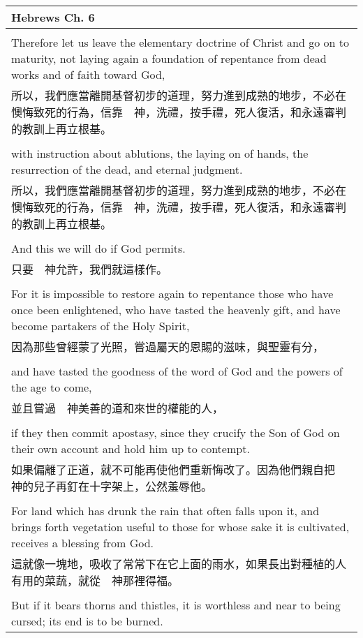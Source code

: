 \begin{tabularx}{\textwidth}{p{}}
\hline
Hebrews Ch. 6 \\
\hline \\
Therefore let us leave the elementary doctrine of Christ and go on to maturity, not laying again a foundation of repentance from dead works and of faith toward God, \\
所以，我們應當離開基督初步的道理，努力進到成熟的地步，不必在懊悔致死的行為，信靠　神，洗禮，按手禮，死人復活，和永遠審判的教訓上再立根基。 \\ \\
with instruction about ablutions, the laying on of hands, the resurrection of the dead, and eternal judgment. \\
所以，我們應當離開基督初步的道理，努力進到成熟的地步，不必在懊悔致死的行為，信靠　神，洗禮，按手禮，死人復活，和永遠審判的教訓上再立根基。 \\ \\
And this we will do if God permits. \\
只要　神允許，我們就這樣作。 \\ \\
For it is impossible to restore again to repentance those who have once been enlightened, who have tasted the heavenly gift, and have become partakers of the Holy Spirit, \\
因為那些曾經蒙了光照，嘗過屬天的恩賜的滋味，與聖靈有分， \\ \\
and have tasted the goodness of the word of God and the powers of the age to come, \\
並且嘗過　神美善的道和來世的權能的人， \\ \\
if they then commit apostasy, since they crucify the Son of God on their own account and hold him up to contempt. \\
如果偏離了正道，就不可能再使他們重新悔改了。因為他們親自把　神的兒子再釘在十字架上，公然羞辱他。 \\ \\
For land which has drunk the rain that often falls upon it, and brings forth vegetation useful to those for whose sake it is cultivated, receives a blessing from God. \\
這就像一塊地，吸收了常常下在它上面的雨水，如果長出對種植的人有用的菜蔬，就從　神那裡得福。 \\ \\
But if it bears thorns and thistles, it is worthless and near to being cursed; its end is to be burned. \\

\end{tabularx}
